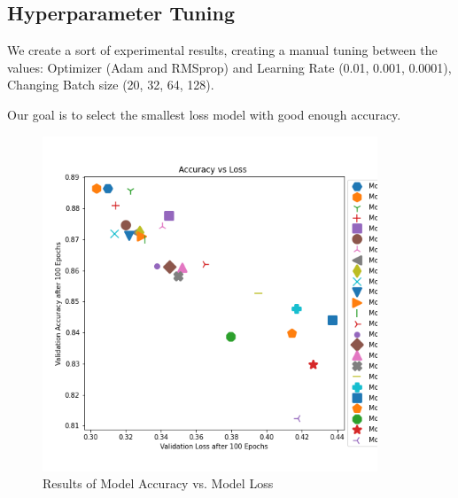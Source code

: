 \documentclass{book}
\begin{document}
            \subsection{Hyperparameter Tuning}

            We create a sort of experimental results, creating a manual tuning between the values: Optimizer (Adam and RMSprop) and Learning Rate (0.01, 0.001, 0.0001), Changing Batch size (20, 32, 64, 128). 

            Our goal is to select the smallest loss model with good enough accuracy.
            
            \begin{figure}[h]
                \centering
                \includegraphics[width=10cm]{smc-accuracy-loss.png}
                \caption{Results of Model Accuracy vs. Model Loss}\label{fig:acc-loss}
            \end{figure}
\end{document}
